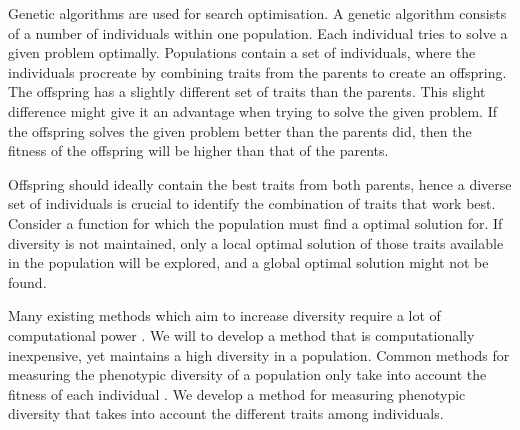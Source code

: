 Genetic algorithms are used for search optimisation. A genetic algorithm consists of a number of individuals within one population. Each individual tries to solve a given problem optimally. Populations contain a set of individuals, where the individuals procreate by combining traits from the parents to create an offspring. The offspring has a slightly different set of traits than the parents. This slight difference might give it an advantage when trying to solve the given problem. If the offspring solves the given problem better than the parents did, then the fitness of the offspring will be higher than that of the parents. 

Offspring should ideally contain the best traits from both parents, hence a diverse set of individuals is crucial to identify the combination of traits that work best. Consider a function for which the population must find a optimal solution for. If diversity is not maintained, only a local optimal solution of those traits available in the population will be explored, and a global optimal solution might not be found.
\cite{ursem2002diversity}

Many existing methods which aim to increase diversity require a lot of computational power \citpls{}. We will to develop a method that is computationally inexpensive, yet maintains a high diversity in a population. Common methods for measuring the phenotypic diversity of a population only take into account the fitness of each individual \citpls{}. We develop a method for measuring phenotypic diversity that takes into account the different traits among individuals. 
